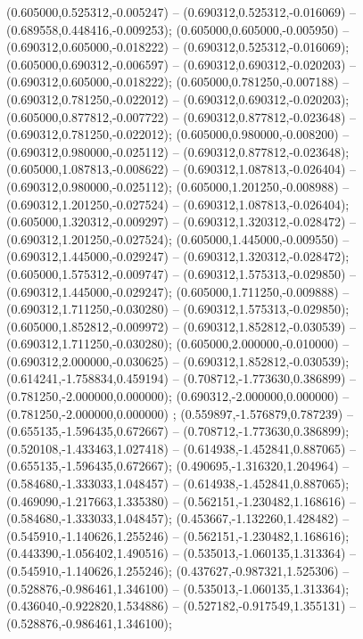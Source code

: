  (0.605000,0.525312,-0.005247) -- (0.690312,0.525312,-0.016069) -- (0.689558,0.448416,-0.009253);
 (0.605000,0.605000,-0.005950) -- (0.690312,0.605000,-0.018222) -- (0.690312,0.525312,-0.016069);
 (0.605000,0.690312,-0.006597) -- (0.690312,0.690312,-0.020203) -- (0.690312,0.605000,-0.018222);
 (0.605000,0.781250,-0.007188) -- (0.690312,0.781250,-0.022012) -- (0.690312,0.690312,-0.020203);
 (0.605000,0.877812,-0.007722) -- (0.690312,0.877812,-0.023648) -- (0.690312,0.781250,-0.022012);
 (0.605000,0.980000,-0.008200) -- (0.690312,0.980000,-0.025112) -- (0.690312,0.877812,-0.023648);
 (0.605000,1.087813,-0.008622) -- (0.690312,1.087813,-0.026404) -- (0.690312,0.980000,-0.025112);
 (0.605000,1.201250,-0.008988) -- (0.690312,1.201250,-0.027524) -- (0.690312,1.087813,-0.026404);
 (0.605000,1.320312,-0.009297) -- (0.690312,1.320312,-0.028472) -- (0.690312,1.201250,-0.027524);
 (0.605000,1.445000,-0.009550) -- (0.690312,1.445000,-0.029247) -- (0.690312,1.320312,-0.028472);
 (0.605000,1.575312,-0.009747) -- (0.690312,1.575313,-0.029850) -- (0.690312,1.445000,-0.029247);
 (0.605000,1.711250,-0.009888) -- (0.690312,1.711250,-0.030280) -- (0.690312,1.575313,-0.029850);
 (0.605000,1.852812,-0.009972) -- (0.690312,1.852812,-0.030539) -- (0.690312,1.711250,-0.030280);
 (0.605000,2.000000,-0.010000) -- (0.690312,2.000000,-0.030625) -- (0.690312,1.852812,-0.030539);
 (0.614241,-1.758834,0.459194) -- (0.708712,-1.773630,0.386899) -- (0.781250,-2.000000,0.000000);
 (0.690312,-2.000000,0.000000) -- (0.781250,-2.000000,0.000000) ;
 (0.559897,-1.576879,0.787239) -- (0.655135,-1.596435,0.672667) -- (0.708712,-1.773630,0.386899);
 (0.520108,-1.433463,1.027418) -- (0.614938,-1.452841,0.887065) -- (0.655135,-1.596435,0.672667);
 (0.490695,-1.316320,1.204964) -- (0.584680,-1.333033,1.048457) -- (0.614938,-1.452841,0.887065);
 (0.469090,-1.217663,1.335380) -- (0.562151,-1.230482,1.168616) -- (0.584680,-1.333033,1.048457);
 (0.453667,-1.132260,1.428482) -- (0.545910,-1.140626,1.255246) -- (0.562151,-1.230482,1.168616);
 (0.443390,-1.056402,1.490516) -- (0.535013,-1.060135,1.313364) -- (0.545910,-1.140626,1.255246);
 (0.437627,-0.987321,1.525306) -- (0.528876,-0.986461,1.346100) -- (0.535013,-1.060135,1.313364);
 (0.436040,-0.922820,1.534886) -- (0.527182,-0.917549,1.355131) -- (0.528876,-0.986461,1.346100);
